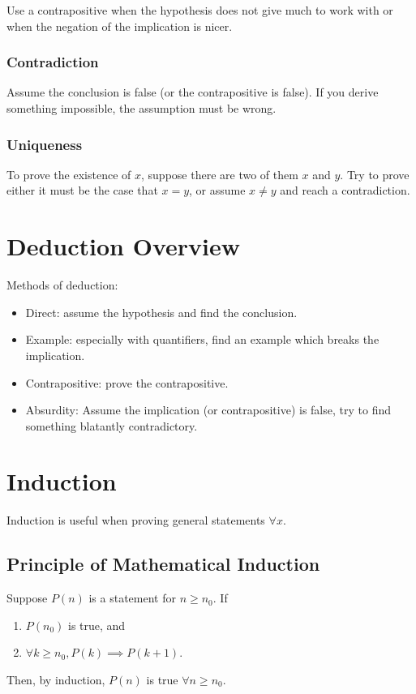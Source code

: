\documentclass[12pt]{article}
\begin{document}


Use a contrapositive when the hypothesis does not give much to work with or when the negation of the implication is nicer.

\subsubsection*{Contradiction}
Assume the conclusion is false (or the contrapositive is false). If you derive something impossible, the assumption must be wrong.

\subsubsection*{Uniqueness}
To prove the existence of $x$, suppose there are two of them $x$ and $y$. Try to prove either it must be the case that $x = y$, or assume $x \neq y$ and reach a contradiction.

\section*{Deduction Overview}
Methods of deduction:
\begin{itemize}
\item Direct: assume the hypothesis and find the conclusion.
\item Example: especially with quantifiers, find an example which breaks the implication.
\item Contrapositive: prove the contrapositive.
\item Absurdity: Assume the implication (or contrapositive) is false, try to find something blatantly contradictory.
\end{itemize}

\section*{Induction}
Induction is useful when proving general statements $\forall x$.

\subsection*{Principle of Mathematical Induction}
Suppose $P(n)$ is a statement for $n \geq n_0$. If
\begin{enumerate}
\item $P(n_0)$ is true, and
\item $\forall k \geq n_0, P(k) \implies P(k+1)$.
\end{enumerate}
Then, by induction, $P(n)$ is true $\forall n \geq n_0$.
\end{document}
